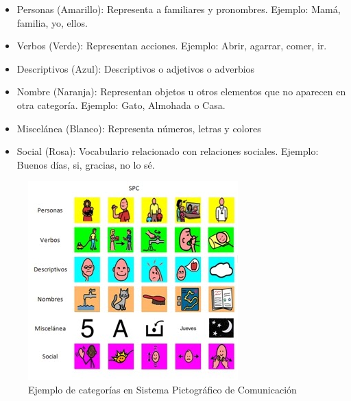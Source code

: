 \begin{itemize}
	\item Personas (Amarillo): Representa a familiares y pronombres. Ejemplo: Mamá, familia,  yo, ellos.
	\item Verbos (Verde): Representan acciones. Ejemplo: Abrir, agarrar, comer, ir.
	\item Descriptivos (Azul): Descriptivos o adjetivos o adverbios
	\item Nombre (Naranja): Representan objetos u otros elementos que no aparecen en otra categoría. Ejemplo: Gato, Almohada o Casa.
	\item Miscelánea (Blanco): Representa números, letras y colores
	\item Social (Rosa): Vocabulario relacionado con relaciones sociales. Ejemplo: Buenos días, si, gracias, no lo sé.
	
\end{itemize}


\begin{figure}[h!]
	\centering
	\includegraphics[width=0.7\linewidth]{Imagenes/Bitmap/SPCcolores}
	\caption{Ejemplo de categorías en Sistema Pictográfico de Comunicación}
	\label{fig:spccolores}
\end{figure}



